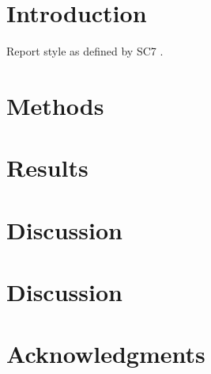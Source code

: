 \section{Introduction}

Report style as defined by SC7 \citep{SC7}.

\section{Methods}

\section{Results}

\section{Discussion}

\section{Discussion}

\section{Acknowledgments}

 